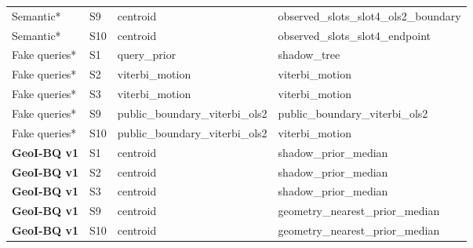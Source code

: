 \begin{longtable}{@{}P{2.5cm}P{.6cm}P{4.5cm}P{4.5cm}@{}}
Semantic* & S9 & centroid & observed\_\allowbreak{}slots\_\allowbreak{}slot4\_\allowbreak{}ols2\_\allowbreak{}boundary \\
Semantic* & S10 & centroid & observed\_\allowbreak{}slots\_\allowbreak{}slot4\_\allowbreak{}endpoint \\
Fake queries* & S1 & query\_\allowbreak{}prior & shadow\_\allowbreak{}tree \\
Fake queries* & S2 & viterbi\_\allowbreak{}motion & viterbi\_\allowbreak{}motion \\
Fake queries* & S3 & viterbi\_\allowbreak{}motion & viterbi\_\allowbreak{}motion \\
Fake queries* & S9 & public\_\allowbreak{}boundary\_\allowbreak{}viterbi\_\allowbreak{}ols2 & public\_\allowbreak{}boundary\_\allowbreak{}viterbi\_\allowbreak{}ols2 \\
Fake queries* & S10 & public\_\allowbreak{}boundary\_\allowbreak{}viterbi\_\allowbreak{}ols2 & viterbi\_\allowbreak{}motion \\
\textbf{GeoI-BQ v1} & S1 & centroid & shadow\_\allowbreak{}prior\_\allowbreak{}median \\
\textbf{GeoI-BQ v1} & S2 & centroid & shadow\_\allowbreak{}prior\_\allowbreak{}median \\
\textbf{GeoI-BQ v1} & S3 & centroid & shadow\_\allowbreak{}prior\_\allowbreak{}median \\
\textbf{GeoI-BQ v1} & S9 & centroid & geometry\_\allowbreak{}nearest\_\allowbreak{}prior\_\allowbreak{}median \\
\textbf{GeoI-BQ v1} & S10 & centroid & geometry\_\allowbreak{}nearest\_\allowbreak{}prior\_\allowbreak{}median \\
\end{longtable}

\endgroup
